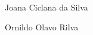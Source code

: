 \documentclass[a4paper,10pt]{article}
\begin{document}
	\begin{multicols}{2}
	Joana Ciclana da Silva 
           
	\columnbreak

	Ornildo Olavo Rilva
	\end{multicols}
	
\end{document}
